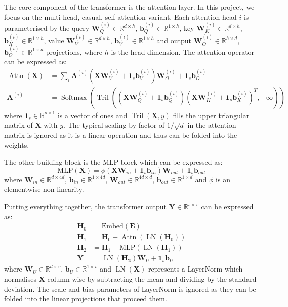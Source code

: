 \documentclass{article}
\renewcommand{\v}[1]{\mathbf{\bm{#1}}}
\newcommand{\m}[1]{\mathbf{\bm{#1}}}
\newcommand{\R}{\mathbb{R}}
\DeclareMathOperator{\softmax}{Softmax}
\DeclareMathOperator{\layernorm}{LN}
\DeclareMathOperator{\tril}{Tril}
\DeclareMathOperator{\attn}{Attn}
\begin{document}
The core component of the transformer is the attention layer. In this project, we focus on the multi-head, casual, self-attention variant. Each attention head $i$ is parameterised by the query $\m{W}_Q^{(i)} \in \R^{d \times h}$, $\v{b}_Q^{(i)} \in \R^{1 \times h}$, key $\m{W}_K^{(i)} \in \R^{d \times h}$, $\v{b}_K^{(i)} \in \R^{1 \times h}$, value $\m{W}_V^{(i)} \in \R^{d \times h}$, $\v{b}_V^{(i)} \in \R^{1 \times h}$ and output $\m{W}_O^{(i)} \in \R^{h \times d}$, $\v{b}_O^{(i)} \in \R^{1 \times d}$ projections, where $h$ is the head dimension. The attention operator can be expressed as:
\begin{equation}  \label{eq:attn}
    \begin{aligned}
        \attn(\m{X})
         & = \sum_i \m{A}^{(i)} (\m{X} \m{W}_V^{(i)} + \v{1}_s \v{b}_V^{(i)}) \m{W}_O^{(i)} + \v{1}_s \v{b}_O^{(i)} \\
        \m{A}^{(i)}
         & = \softmax\left(
        \tril\left(
        \left(\m{X} \m{W}_Q^{(i)} + \v{1}_s \v{b}_Q^{(i)}\right)
        \left(\m{X} \m{W}_K^{(i)} + \v{1}_s \v{b}_K^{(i)}\right)^T
        , -\infty\right)
        \right)
    \end{aligned}
\end{equation}
where $\v{1}_s \in \R^{s \times 1}$ is a vector of ones and $\tril(\m{X}, y)$ fills the upper triangular matrix of $\m{X}$ with $y$. The typical scaling by factor of $1/\sqrt{d}$ in the attention matrix is ignored as it is a linear operation and thus can be folded into the weights.

The other building block is the MLP block which can be expressed as:
\begin{equation*}
    \text{MLP}(\m{X}) = \phi(
    \m{X} \m{W}_{in} + \v{1}_s \m{b}_{in}
    ) \m{W}_{out} + \v{1}_s \m{b}_{out}
\end{equation*}
where $\m{W}_{in} \in \R^{d \times 4d}$, $\v{b}_{in} \in \R^{1 \times 4d}$, $\m{W}_{out} \in \R^{4d \times d}$, $\v{b}_{out} \in \R^{1 \times d}$ and $\phi$ is an elementwise non-linearity.

Putting everything together, the transformer output $\m{Y} \in \R^{s \times v}$ can be expressed as:
\begin{equation}  \label{eq:transformer}
    \begin{aligned}
        \m{H}_0 & = \text{Embed}(\m{E})                           \\
        \m{H}_1 & = \m{H}_0 + \attn(\layernorm(\m{H}_0))          \\
        \m{H}_2 & = \m{H}_1 + \text{MLP}(\layernorm(\m{H}_1))     \\
        \m{Y}   & = \layernorm(\m{H_2}) \m{W}_U + \v{1}_s \v{b}_U
    \end{aligned}
\end{equation}
where $\m{W}_U \in \R^{d \times v}$, $\v{b}_U \in \R ^{1 \times v}$ and $\layernorm(\m{X})$ represents a LayerNorm which normalises $\m{X}$ column-wise by subtracting the mean and dividing by the standard deviation. The scale and bias parameters of LayerNorm is ignored as they can be folded into the linear projections that proceed them.
\end{document}
